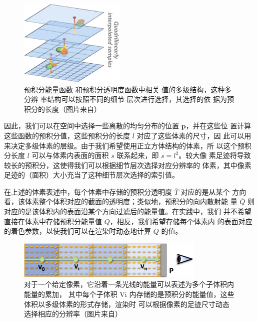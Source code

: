\begin{figure}
\sidecaption
	\includegraphics[width=0.45\textwidth]{figures/vct/vct-7-6}
	\caption{预积分能量函数 和预积分透明度函数中相关 值的多级结构，这种多分辨 率结构可以按照不同的细节 层次进行选择，其选择的依 据为预积分的长度（图片来自\cite{a:InteractiveIndirectIlluminationUsingVoxelConeTracing}）}
	\label{f:vct-7-6}
\end{figure}

因此，我们可以在空间中选择一些离散的均匀分布的位置 $\mathbf{p}$，并在这些位 置计算这些函数的预积分值，这些预积分的长度 $l$ 对应了这些体素的尺寸，因 此可以用来决定多级体素的层级。由于我们希望使用正立方体结构的体素，所 以这个预积分长度 $l$ 可以与体素内表面的面积 $s$ 联系起来，即 $s = l^{2}$。较大像 素足迹将导致较长的预积分，这使得我们可以根据细节层次选择对应分辨率的 体素，其中像素足迹的（面积）大小充当了这种细节层次选择的索引值。

在上述的体素表述中，每个体素中存储的预积分透明度 $\overline{T}$ 对应的是从某个 方向看，该体素整个体积对应的截面的透明度；类似地，预积分的向内散射能 量 $\overline{Q}$ 则对应的是该体积内的表面沿某个方向过滤后的能量值。在实践中，我们 并不希望直接在体素中存储预积分能量值 $\overline{Q}$，相反，我们希望存储每个体素内 的表面对应的着色参数，以使我们可以在渲染时动态地计算 $\overline{Q}$ 的值。

\begin{figure}
\begin{center}
	\includegraphics[width=0.8\textwidth]{figures/vct/vct-7-3}
	\end{center}
	\caption{对于一个给定像素，它沿着一条光线的能量可以表述为多个子体积内能量的累加， 其中每个子体积 Vi 内存储的是预积分的能量值，这些体积以多级体素的形式存储，渲染时 可以根据像素的足迹尺寸动态选择相应的分辨率（图片来自\cite{a:InteractiveIndirectIlluminationUsingVoxelConeTracing}）}
	\label{f:vct-7-3}
\end{figure}

